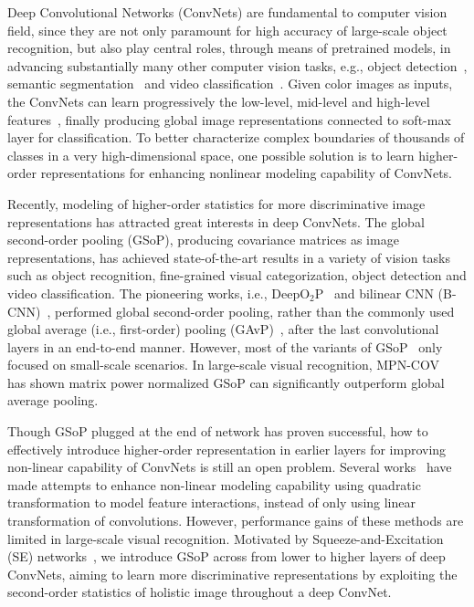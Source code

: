\documentclass[10pt,twocolumn,letterpaper]{article}
\begin{document}
Deep Convolutional  Networks (ConvNets)  are fundamental to computer vision field, since they are  not only paramount  for high accuracy of large-scale object recognition, but also play central roles, through means of pretrained models, in   advancing  substantially many other computer vision tasks,  e.g., object detection~\cite{Redmon_2017_CVPR}, semantic segmentation~\cite{Long_2015_CVPR} and video classification~\cite{Wang_2018_CVPR_nonlocal}.  
Given color images as inputs, the ConvNets can learn progressively the low-level, mid-level and high-level features~\cite{Zeiler2014}, finally producing  global image representations connected to  soft-max layer for classification. To better characterize complex boundaries of thousands of classes in a very high-dimensional space, one possible solution is to learn higher-order representations for enhancing nonlinear modeling capability of ConvNets. 

Recently, modeling of higher-order statistics for more discriminative image representations  has attracted great interests in deep ConvNets. The global second-order pooling (GSoP), producing covariance matrices as image representations, has achieved state-of-the-art results in a variety of vision tasks~\cite{Li_2018_CVPR,Cui_2017_CVPR,Wang_2018_CVPR,WangYunbo_2017_CVPR} such as  object recognition, fine-grained visual categorization, object detection and video classification.  The pioneering  works, i.e., DeepO$_{2}$P~\cite{Ionescu_2015_ICCV} and  bilinear CNN (B-CNN)~\cite{lin2015bilinear}, performed  global second-order pooling, rather than the commonly used global average (i.e., first-order) pooling (GAvP)~\cite{Lin_ICLR_2014_GFoP},  after the last convolutional layers in an end-to-end manner. However, most of the variants of GSoP~\cite{Gao_2016_CVPR,Cai_2017_ICCV} only focused on small-scale scenarios. In large-scale visual recognition,  MPN-COV~\cite{Li_2017_ICCV,Li_2018_CVPR} has shown matrix power normalized GSoP can significantly  outperform global average pooling. 


Though GSoP plugged at the end of network  has proven successful,  how to effectively introduce higher-order representation in earlier layers for improving non-linear capability of ConvNets is still an open problem. Several works~\cite{LiYanghao_2017_ICCV,Wang_2017_ICCV,Zoumpourlis_2017_ICCV} have made attempts  to enhance non-linear
modeling capability using quadratic transformation to model feature interactions, instead of only using linear transformation of convolutions.  However, performance gains of these
methods are limited in large-scale visual recognition.   Motivated by Squeeze-and-Excitation (SE) networks~\cite{Hu_2018_CVPR_SE}, we introduce GSoP across from lower to higher layers of deep ConvNets,  aiming to learn more discriminative  representations  by exploiting the second-order statistics of holistic image throughout a deep ConvNet.
\end{document}
